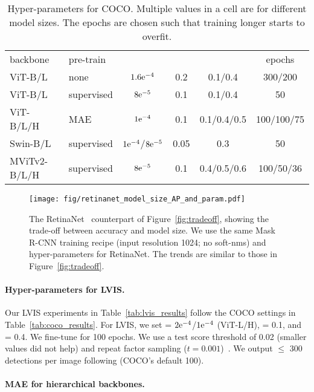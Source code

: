 \documentclass[runningheads]{llncs}
\begin{document}
\begin{table}[t]
    \begin{tabular}{llcccc}
    	backbone & pre-train & \lr & \wtd & \drp & epochs \\
    	\shline
    	ViT-B/L & none & ${1.6}\mathrm{e}^{-4}$ & 0.2 & 0.1/0.4 & 300/200 \\
    	ViT-B/L & supervised & ${8}\mathrm{e}^{-5}$ & 0.1 & 0.1/0.4 & 50 \\
    	ViT-B/L/H & MAE & ${1}\mathrm{e}^{-4}$ & 0.1 & 0.1/0.4/0.5 & 100/100/75 \\
    	\hline
    	Swin-B/L & supervised & ${1}\mathrm{e}^{-4}$/${8}\mathrm{e}^{-5}$ & 0.05 & 0.3 & 50 \\
    	MViTv2-B/L/H & supervised & ${8}\mathrm{e}^{-5}$ & 0.1 & 0.4/0.5/0.6 & 100/50/36
    \end{tabular}
    \vspace{.5em}
    \caption{Hyper-parameters for COCO. Multiple values in a cell are for different model sizes. The epochs are chosen such that training longer starts to overfit.
     \label{app:tab:hyper}
    }
\end{table}

\begin{figure}[t]\centering
\texttt{[image: fig/retinanet\_model\_size\_AP\_and\_param.pdf]}
\caption{The RetinaNet~\cite{Lin2017a} counterpart of Figure~\ref{fig:tradeoff}, showing the trade-off between accuracy and model size. We use the same Mask R-CNN training recipe (input resolution 1024; no soft-nms) and hyper-parameters for RetinaNet. The trends are similar to those in Figure~\ref{fig:tradeoff}.
\label{fig:retinanet_tradeoff}
}
\vspace{-1em}
\end{figure}

\paragraph{Hyper-parameters for LVIS.}
Our LVIS experiments in Table~\ref{tab:lvis_results} follow the COCO settings in Table~\ref{tab:coco_results}.
For LVIS, we set \lr = ${2}\mathrm{e}^{-4}$/${1}\mathrm{e}^{-4}$ (ViT-L/H), \wtd = 0.1, and \drp = 0.4. We fine-tune for 100 epochs. We use a test score threshold of 0.02 (smaller values did not help) and repeat factor sampling ($t = 0.001$)~\cite{Gupta2019}. We output $\le$ 300 detections per image following \cite{Gupta2019} (\vs COCO's default 100).

\paragraph{MAE for hierarchical backbones.}
\end{document}
